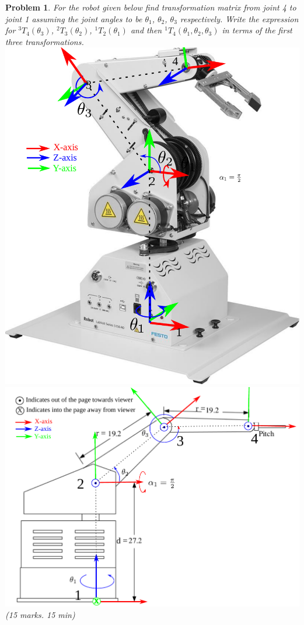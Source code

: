 \documentclass[twocolumn]{article}
\newtheorem{prob}{Problem}
\begin{document}
\begin{prob}
  For the robot given below find transformation matrix from joint 4 to joint 1
  assuming the joint angles to be  $\theta_1$, $\theta_2$, $\theta_3$
  respectively. Write the expression for ${}^3T_4(\theta_3)$, ${}^2T_3(\theta_2)$, ${}^1T_2(\theta_1)$
  and then ${}^1T_4(\theta_1, \theta_2, \theta_3)$ in terms of the first three transformations.
  \\
  \includegraphics[width=\linewidth]{robot3D.pdf}
  \\
  \includegraphics[width=\linewidth]{robot.pdf}
  (15 marks. 15 min)
\end{prob}
\end{document}
